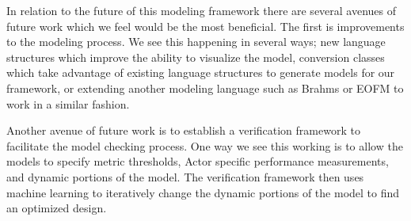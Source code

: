 In relation to the future of this modeling framework there are several avenues of future work which we feel would be the most beneficial.  The first is improvements to the modeling process.  We see this happening in several ways; new language structures which improve the ability to visualize the model, conversion classes which take advantage of existing language structures to generate models for our framework, or extending another modeling language such as Brahms or EOFM to work in a similar fashion.

Another avenue of future work is to establish a verification framework to facilitate the model checking process.  One way we see this working is to allow the models to specify metric thresholds, Actor specific performance measurements, and dynamic portions of the model.  The verification framework then uses machine learning to iteratively change the dynamic portions of the model to find an optimized design.



